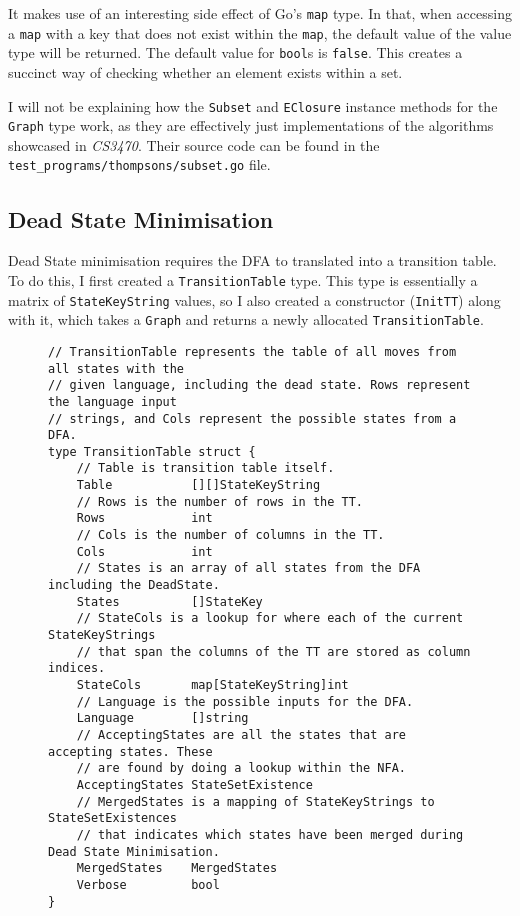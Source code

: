 It makes use of an interesting side effect of Go's \texttt{map} type. In that, when accessing a \texttt{map} with a key that does not exist within the \texttt{map}, the default value of the value type will be returned. The default value for \texttt{bool}s is \texttt{false}. This creates a succinct way of checking whether an element exists within a set.

I will not be explaining how the \verb|Subset| and \verb|EClosure| instance methods for the \verb|Graph| type work, as they are effectively just implementations of the algorithms showcased in \textit{CS3470}. Their source code can be found in the \verb|test_programs/thompsons/subset.go| file.

\subsection{Dead State Minimisation}

Dead State minimisation requires the DFA to translated into a transition table. To do this, I first created a \verb|TransitionTable| type. This type is essentially a matrix of \verb|StateKeyString| values, so I also created a constructor (\verb|InitTT|) along with it, which takes a \verb|Graph| and returns a newly allocated \verb|TransitionTable|.

\begin{figure}[H]    
    \begin{verbatim}
// TransitionTable represents the table of all moves from all states with the
// given language, including the dead state. Rows represent the language input
// strings, and Cols represent the possible states from a DFA.
type TransitionTable struct {
    // Table is transition table itself.
    Table           [][]StateKeyString
    // Rows is the number of rows in the TT.
    Rows            int
    // Cols is the number of columns in the TT.
    Cols            int
    // States is an array of all states from the DFA including the DeadState.
    States          []StateKey
    // StateCols is a lookup for where each of the current StateKeyStrings 
    // that span the columns of the TT are stored as column indices.
    StateCols       map[StateKeyString]int
    // Language is the possible inputs for the DFA.
    Language        []string
    // AcceptingStates are all the states that are accepting states. These 
    // are found by doing a lookup within the NFA.
    AcceptingStates StateSetExistence
    // MergedStates is a mapping of StateKeyStrings to StateSetExistences 
    // that indicates which states have been merged during Dead State Minimisation.
    MergedStates    MergedStates
    Verbose         bool
}
    \end{verbatim}
\end{figure}

